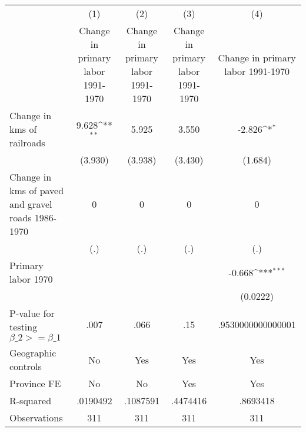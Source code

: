 {
\def\sym#1{\ifmmode^{#1}\else\(^{#1}\)\fi}
\begin{tabular}{l*{4}{c}}
\hline\hline
                &\multicolumn{1}{c}{(1)}&\multicolumn{1}{c}{(2)}&\multicolumn{1}{c}{(3)}&\multicolumn{1}{c}{(4)}\\
                &\multicolumn{1}{c}{Change in primary labor 1991-1970}&\multicolumn{1}{c}{Change in primary labor 1991-1970}&\multicolumn{1}{c}{Change in primary labor 1991-1970}&\multicolumn{1}{c}{Change in primary labor 1991-1970}\\
\hline
Change in kms of railroads&    9.628\sym{**} &    5.925         &    3.550         &   -2.826\sym{*}  \\
                &  (3.930)         &  (3.938)         &  (3.430)         &  (1.684)         \\
[1em]
Change in kms of paved and gravel roads 1986-1970&        0         &        0         &        0         &        0         \\
                &      (.)         &      (.)         &      (.)         &      (.)         \\
[1em]
Primary labor 1970&                  &                  &                  &   -0.668\sym{***}\\
                &                  &                  &                  & (0.0222)         \\
\hline
P-value for testing $\beta\_{2} >= \beta\_{1}$&     .007         &     .066         &      .15         &.9530000000000001         \\
Geographic controls&       No         &      Yes         &      Yes         &      Yes         \\
Province FE     &       No         &       No         &      Yes         &      Yes         \\
R-squared       & .0190492         & .1087591         & .4474416         & .8693418         \\
Observations    &      311         &      311         &      311         &      311         \\
\hline\hline
\end{tabular}
}
